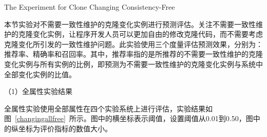 
{The Experiment for Clone Changing Consistency-Free }

本节实验对不需要一致性维护的克隆变化实例进行预测评估。关注不需要一致性维护的克隆变化实例，让程序开发人员可以更加自由的修改克隆代码，而不需要考虑克隆变化所引发的一致性维护问题。此实验使用三个度量评估预测效果，分别为：推荐率、精确率和召回率。其中，推荐率指的是所推荐的不需要一致性维护的克隆变化实例与所有实例的比例，即预测为不需要一致性维护的克隆变化实例与系统中全部变化实例的比值。


（1）全属性实验结果

全属性实验使用全部属性在四个实验系统上进行评估，实验结果如图~\ref{changingallfree}~所示。图中的横坐标表示阈值，设置阈值从0.01到0.50，图中的纵坐标为评价指标的数值大小。

